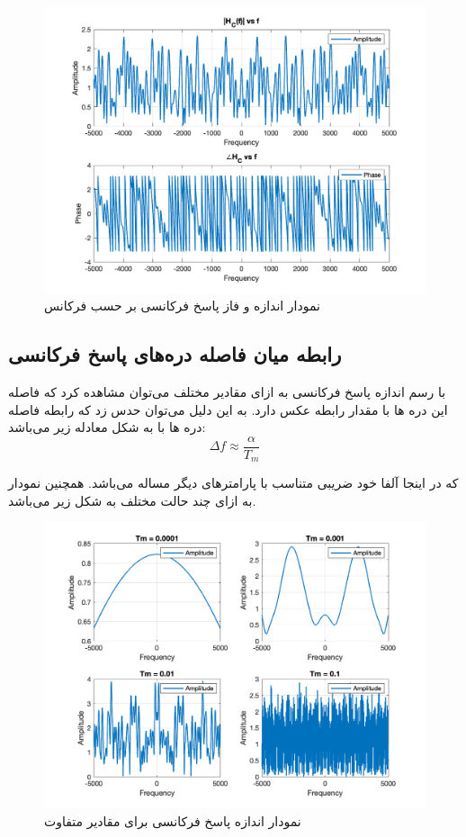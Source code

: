 \documentclass[10pt]{article}
\begin{document}
	\begin{figure}[h]
		\centering
		\includegraphics[width=0.9\linewidth]{../pics/q1-2}
		\caption{نمودار اندازه و فاز پاسخ فرکانسی بر حسب فرکانس}
		\label{fig:q1-2}
	\end{figure}
	
	\subsection{رابطه میان فاصله دره‌های پاسخ فرکانسی}
	با رسم اندازه پاسخ فرکانسی به ازای مقادیر مختلف 
	می‌توان مشاهده کرد که فاصله این دره ها با مقدار 
	رابطه عکس دارد. به این دلیل می‌توان حدس زد که رابطه فاصله دره ها با 
	به شکل معادله زیر می‌باشد:
	\[\Delta f \approx \frac{\alpha}{T_m}\]
	
	\noindent
	که در اینجا آلفا خود ضریبی متناسب با پارامتر‌های دیگر مساله می‌باشد.
	همچنین نمودار به ازای چند حالت مختلف به شکل زیر می‌باشد.
	\newpage
	\begin{figure}[h]
		\centering
		\includegraphics[width=0.9\linewidth]{../pics/q1-3}
		\caption{نمودار اندازه پاسخ فرکانسی برای مقادیر متفاوت 
		}
		\label{fig:q1-3}
	\end{figure}
\end{document}
